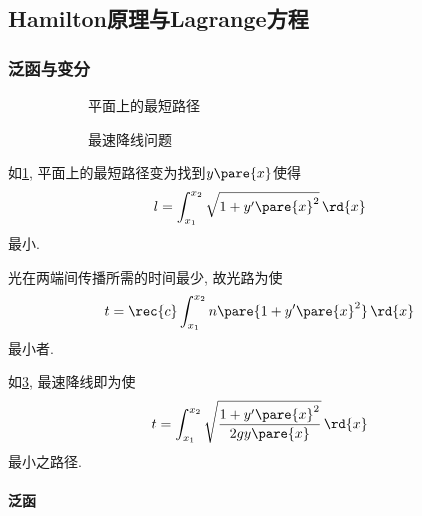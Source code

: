 \documentclass{ctexart}
\begin{document}



\subsection{Hamilton原理与Lagrange方程} %
\label{sub:hamilton原理与lagrange方程}

\subsubsection{泛函与变分} %
\label{ssub:泛函与变分}

\begin{figure}[ht]
    \centering
    \begin{subfigure}[b]{.47\textwidth}
        \centering
        \caption{平面上的最短路径}
        \label{fig:平面上的最短路径}
    \end{subfigure}
    \begin{subfigure}[b]{.47\textwidth}
        \centering
        \caption{最速降线问题}
        \label{fig:最速降线问题}
    \end{subfigure}
    \caption{}
\end{figure}
\begin{ex}[平面上的最短路径]
    \label{ex:平面上的最短路径}
    如\cref{fig:平面上的最短路径}, 平面上的最短路径变为找到$y\pare{x}$使得
    \[ l = \int_{x_1}^{x_2} \sqrt{1+y'\pare{x}^2}\,\rd{x} \]
    最小.
\end{ex}
\begin{ex}[Fermat原理]
    \label{ex:Fermat原理}
    光在两端间传播所需的时间最少, 故光路为使
    \[ t = \rec{c} \int_{x_1}^{x_2} n\pare{1+y'\pare{x}^2}\,\rd{x} \]
    最小者.
\end{ex}
\begin{ex}[最速降线问题]
    \label{ex:最速降线问题}
    如\cref{fig:最速降线问题}, 最速降线即为使
    \[ t = \int_{x_1}^{x_2} \sqrt{\frac{1+y'\pare{x}^2}{2gy\pare{x}}}\,\rd{x} \]
    最小之路径.
\end{ex}


\paragraph{泛函} %
\label{par:泛函}
\end{document}
